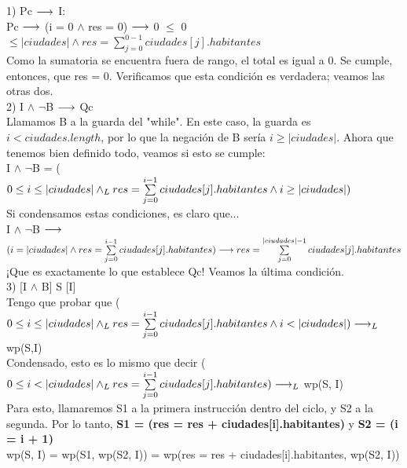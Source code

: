 \documentclass[10pt,a4paper]{article}
\begin{document}
    1) Pc $\longrightarrow$ I: \\
    
        Pc $\longrightarrow$ (i = 0 $\wedge$ res = 0) $\longrightarrow$ 0 $\leq$ 0 $\leq |ciudades| \wedge  res = \sum\limits_{j=0}^{0 - 1}ciudades[j].habitantes$ \\
        Como la sumatoria se encuentra fuera de rango, el total es igual a 0. Se cumple, entonces, que res = 0. Verificamos que esta condición es verdadera; veamos las otras dos.\\
        
    2) I $\wedge$  $\neg$B $\longrightarrow$ Qc  \\
    
    Llamamos B a la guarda del "while". En este caso, la guarda es $ i < ciudades.length$, por lo que la negación de B sería $i \geq |ciudades|$. Ahora que tenemos bien definido todo, veamos si esto se cumple: \\
    I $\wedge$  $\neg$B = ($0 \leq i \leq |ciudades| \land _L res = \sum\limits_{j=0}^{i - 1}ciudades[j].habitantes \wedge i \geq |ciudades|)$ \\
    Si condensamos estas condiciones, es claro que... \\
    I $\wedge$  $\neg$B $\longrightarrow$$ (i = |ciudades| \wedge res = \sum\limits_{j=0}^{i - 1}ciudades[j].habitantes) \longrightarrow res = \sum\limits_{j=0}^{|ciudades| - 1}ciudades[j].habitantes$\\
    ¡Que es exactamente lo que establece Qc! Veamos la última condición.\\

    3) [I $\wedge$ B] S [I]\\

    Tengo que probar que {($0 \leq i \leq |ciudades| \land _L res = \sum\limits_{j=0}^{i - 1}ciudades[j].habitantes \wedge i < |ciudades|)  \longrightarrow _L$ wp(S,I)} \\Condensado, esto es lo mismo que decir ($0 \leq i < |ciudades| \land _L res = \sum\limits_{j=0}^{i - 1}ciudades[j].habitantes) \longrightarrow _L$ wp(S, I)\\
    
        Para esto, llamaremos S1 a la primera instrucción dentro del ciclo, y S2 a la segunda. Por lo tanto, \textbf{S1 = (res = res + ciudades[i].habitantes)} y \textbf{S2 = (i = i + 1)}\\
        
    wp(S, I) = wp(S1, wp(S2, I)) = wp(res = res + ciudades[i].habitantes, wp(S2, I))\\
    
\end{document}
